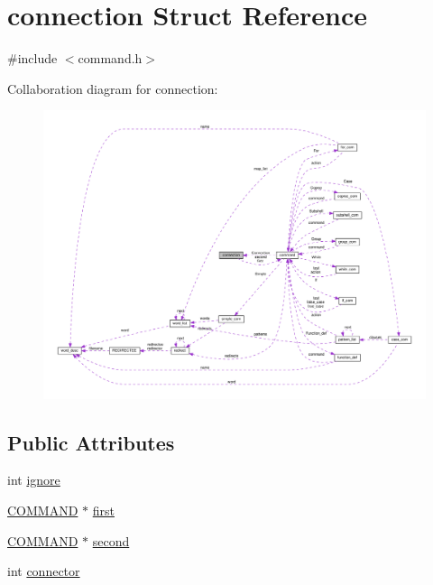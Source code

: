 \hypertarget{structconnection}{}\section{connection Struct Reference}
\label{structconnection}


{\ttfamily \#include $<$command.\+h$>$}



Collaboration diagram for connection\+:
\nopagebreak
\begin{figure}[H]
\begin{center}
\leavevmode
\includegraphics[width=350pt]{structconnection__coll__graph}
\end{center}
\end{figure}
\subsection*{Public Attributes}
\begin{DoxyCompactItemize}
\item 
int \hyperlink{structconnection_a5457e2643b42913b65e75ae6aadc4af6}{ignore}
\item 
\hyperlink{command_8h_a8c41dec142c299806885773c902c0d87}{C\+O\+M\+M\+A\+ND} $\ast$ \hyperlink{structconnection_a63a41b4deafe124ccd4b50c6767c1945}{first}
\item 
\hyperlink{command_8h_a8c41dec142c299806885773c902c0d87}{C\+O\+M\+M\+A\+ND} $\ast$ \hyperlink{structconnection_a3abadad2499f8d84171526134c8a2ce1}{second}
\item 
int \hyperlink{structconnection_a07879bb1744b9d358c5042cd08ef8570}{connector}
\end{DoxyCompactItemize}


